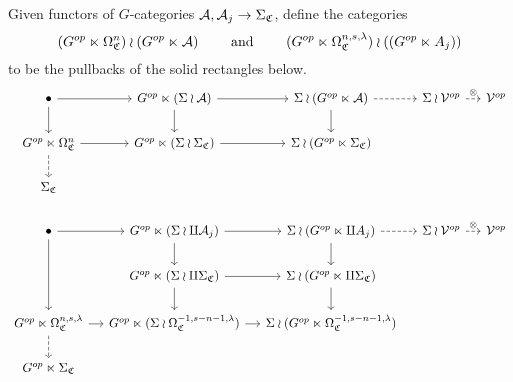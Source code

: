 \documentclass[a4paper,10pt
,draft
]{article}%
\renewcommand{\1}{\eta}%
\newcommand{\SC}{\Sigma_{\mathfrak C}}
\newcommand{\OC}{\Omega_{\mathfrak C}}
\begin{document}
\begin{definition}
      \label{NA_DEF}
      Given functors of $G$-categories $\mathcal{A}, \mathcal{A}_j \to \Sigma_{\mathfrak C}$, define the categories
      \begin{equation}
            (G^{op} \ltimes \Omega_{\mathfrak C}^{n}) \wr (G^{op} \ltimes \mathcal{A})
            \qquad \mbox{ and } \qquad
            (G^{op} \ltimes \Omega_{\mathfrak C}^{n,s,\lambda}) \wr ((G^{op} \ltimes A_j))
      \end{equation}
      to be the pullbacks of the solid rectangles below.
      \begin{equation}
            \label{LSTRINGS_EQ}
            \begin{tikzcd}[column sep = small]
                  \bullet \arrow[d] \arrow[r]
                  &
                  G^{op} \ltimes (\Sigma \wr \A) \arrow[d] \arrow[r]
                  &
                  \Sigma \wr (G^{op} \ltimes \A) \arrow[d] \arrow[r, dashed]
                  &
                  \Sigma \wr \V^{op} \arrow[r, dashed, "\otimes"]
                  &
                  \V^{op}
                  \\
                  G^{op} \ltimes \Omega_{\mathfrak C}^{n} \arrow[r] \arrow[d, dashed]
                  &
                  G^{op} \ltimes (\Sigma \wr \Sigma_{\mathfrak C}) \arrow[r]
                  &
                  \Sigma \wr (G^{op} \ltimes \Sigma_{\mathfrak C})
                  \\
                  \SC
                  \\ %
                  \bullet \arrow[dd] \arrow[r]
                  &
                  G^{op} \ltimes (\Sigma \wr \amalg \A_j) \arrow[d] \arrow[r]
                  &
                  \Sigma \wr (G^{op} \ltimes \amalg A_j) \arrow[d] \arrow[r, dashed]
                  &
                  \Sigma \wr \V^{op} \arrow[r, dashed, "\otimes"]
                  &
                  \V^{op}
                  \\
                  &
                  G^{op} \ltimes (\Sigma \wr \amalg \SC) \arrow[d] \arrow[r]
                  &
                  \Sigma \wr (G^{op} \ltimes \amalg \SC) \arrow[d]
                  \\
                  G^{op} \ltimes \OC^{n,s,\lambda} \arrow[r] \arrow[d, dashed]
                  &
                  G^{op} \ltimes (\Sigma \wr \OC^{-1,s-n-1,\lambda}) \arrow[r]
                  &
                  \Sigma \wr (G^{op} \ltimes \OC^{-1,s-n-1,\lambda})
                  \\
                  G^{op} \ltimes \SC
            \end{tikzcd}
      \end{equation}


\end{definition}
\end{document}
